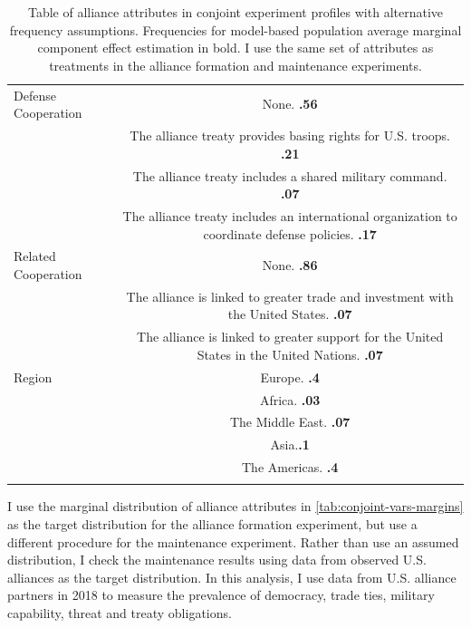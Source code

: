 \documentclass[12pt]{article}
\begin{document}
\begin{table}
\begin{adjustbox}{width = .99\textwidth}
\begin{tabular}{lc}
Defense Cooperation & None. \textbf{.56} \\ 
                    & The alliance treaty provides basing rights for U.S. troops. \textbf{.21}\\
                    & The alliance treaty includes a shared military command. \textbf{.07} \\
                    & The alliance treaty includes an international organization to coordinate defense policies. \textbf{.17} \\ 
Related Cooperation & None. \textbf{.86} \\
                    & The alliance is linked to greater trade and investment with the United States. \textbf{.07}\\ 
                    & The alliance is linked to greater support for the United States in the United Nations. \textbf{.07} \\ 
                    
Region              & Europe. \textbf{.4}\\ 
                    & Africa. \textbf{.03}\\
                    & The Middle East. \textbf{.07}\\ 
                    & Asia.\textbf{.1} \\   
                    & The Americas. \textbf{.4}\\ 
                                                                            
\hline \\
\end{tabular}
\end{adjustbox}
\caption{Table of alliance attributes in conjoint experiment profiles with alternative frequency assumptions. Frequencies for model-based population average marginal component effect estimation in bold. I use the same set of attributes as treatments in the alliance formation and maintenance experiments.} 
\label{tab:conjoint-vars-margins}
\end{table}


I use the marginal distribution of alliance attributes in \autoref{tab:conjoint-vars-margins} as the target distribution for the alliance formation experiment, but use a different procedure for the maintenance experiment. 
Rather than use an assumed distribution, I check the maintenance results using data from observed U.S. alliances as the target distribution. 
In this analysis, I use data from U.S. alliance partners in 2018 to measure the prevalence of democracy, trade ties, military capability, threat and treaty obligations. 
\end{document}
